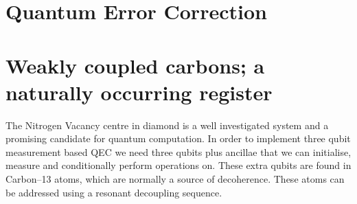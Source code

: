 
\section{Quantum Error Correction}



\section{Weakly coupled carbons; a naturally occurring register }






The Nitrogen Vacancy centre in diamond is a well investigated system\citep{Doherty2013NitrogenVacancy} and a promising candidate for quantum computation\citep{Childress2013Diamond}. In order to implement three qubit measurement based QEC we need three qubits plus ancillae that we can initialise, measure and conditionally perform operations on. These extra qubits are found in Carbon--13 atoms, which are normally a source of decoherence. These atoms can be addressed using a resonant decoupling sequence\citep{Taminiau2012Detectiona}.
